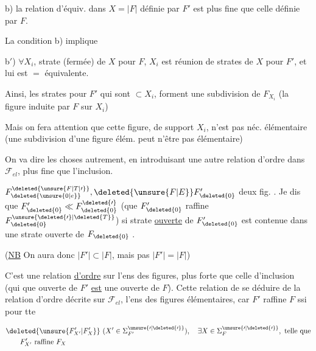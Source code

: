b) la relation d'équiv. dans $X=|F|$ définie par $F'$ est plus fine que celle définie par  $F$.

La condition b) implique

b$'$) $\forall X_i$, strate (fermée) de $X$ pour $F$, $X_i$ est réunion de strates de $X$ pour $F'$,  et  lui est $=$ équivalente.

Ainsi, les strates pour $F'$ qui sont $\subset X_i$, forment une  subdivision de $F_{X_i}$ (la figure  induite par $F$ sur $X_i$)

Mais on fera attention que cette figure, de support $X_i$, n'est pas néc. élémentaire (une subdivision d'une figure élém. peut n'être pas élémentaire)


On va dire les choses autrement, en introduisant une autre relation d'ordre dans $\mathcal{F}_{el}$, plus fine que l'inclusion.


 $F_{\deleted{\unsure{0|e}}}^{\deleted{\unsure{F|T|\prime}}},\deleted{\unsure{F|E}}F_{\deleted{0}}'$ deux fig. . Je dis que $F_{\deleted{0}}'\ll F_{\deleted{0}}^{\deleted{\prime}}$ (que $F_{\deleted{0}}'$ raffine $F_{\deleted{0}}^{\unsure{\deleted{\prime}|\deleted{T}}}$) si   strate \uline{ouverte} de $F_{\deleted{0}}'$ est contenue dans une strate ouverte de $F_{\deleted{0}}$ .

(\uline{NB} On aura  donc $|F'|\subset|F|$, mais pas  $|F'|=|F|$)

C'est une relation \uline{d'ordre} sur l'ens des figures, plus forte que celle d'inclusion (qui   que   ouverte de $F'$ \uline{est} une  ouverte de $F$). Cette relation de    se déduire  de la relation d'ordre  décrite sur $\mathcal{F}_{el}$, l'ens des figures élémentaires, car $F'$ raffine $F$ ssi pour tte

\[
\begin{aligned}
&\deleted{\unsure{F'_{X'}|F'_{X}}}\ (X'\in{\Sigma}^{\unsure{\prime|\deleted{\prime}}}_{F'}),\quad \exists X\in\Sigma^{\unsure{\prime|\deleted{\prime}}}_F,\ \text{telle que}\\
&\qquad F'_{X'}\ \text{raffine}\ F_X
\end{aligned}
\]

